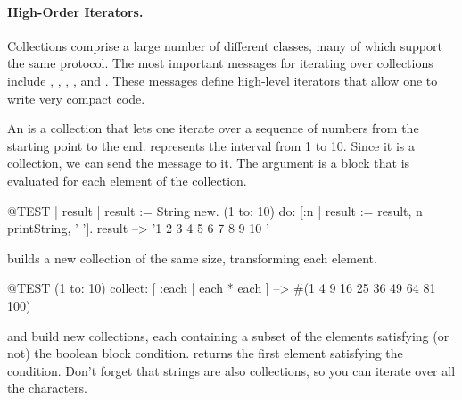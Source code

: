 \documentclass[a4paper,10pt,twoside]{book}
\begin{document}

\paragraph{High-Order Iterators.}
Collections comprise a large number of different classes, many of which support the same protocol.
The most important messages for iterating over collections include
, , , ,  and .
These messages define high-level iterators that allow one to write very compact code.

An  is a collection that lets one iterate over a sequence of numbers from the starting point to the end.
 represents the interval from 1 to 10.
Since it is a collection, we can send the message  to it.
The argument is a block that is evaluated for each element of the collection.

\begin{code}{@TEST | result |}
result := String new.
(1 to: 10) do: [:n | result := result, n printString, ' '].
result --> '1 2 3 4 5 6 7 8 9 10 '
\end{code}


 builds a new collection of the same size, transforming each element.
\begin{code}{@TEST}
(1 to: 10) collect: [ :each | each * each ] --> #(1 4 9 16 25 36 49 64 81 100)
\end{code}

 and  build new collections, each containing a subset of the elements satisfying (or not) the boolean block condition.
 returns the first element satisfying the condition.
Don't forget that strings are also collections, so you can iterate over all the characters.
\end{document}
